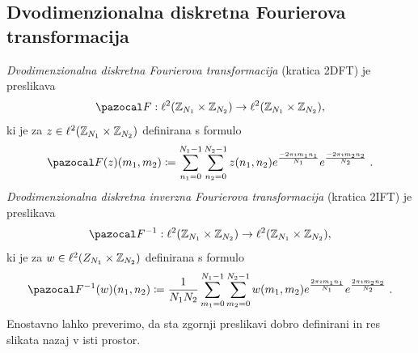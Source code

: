 \subsection{Dvodimenzionalna diskretna Fourierova transformacija}
\emph{Dvodimenzionalna diskretna Fourierova transformacija} (kratica 2DFT) je preslikava
$$\fun{\F}{\l^2(\Z_{N_1} \times \Z_{N_2})}{\l^2(\Z_{N_1} \times \Z_{N_2})},$$
ki je za $z \in \ell^2(\mathbb Z_{N_1} \times \mathbb Z_{N_2})$ definirana s formulo
$$\F(z)(m_1, m_2) \coloneqq \sum_{n_1 = 0}^{N_1 - 1} \sum_{n_2 = 0}^{N_2 - 1} z(n_1, n_2) e^{\frac{-2\pi \imath m_1n_1}{N_1}} e^{\frac{-2\pi \imath m_2n_2}{N_2}} \;.$$
\emph{Dvodimenzionalna diskretna inverzna Fourierova transformacija} (kratica 2IFT) je preslikava
$$\fun{\F^{-1}}{\l^2(\Z_{N_1} \times \Z_{N_2})}{\l^2(\Z_{N_1} \times \Z_{N_2})},$$
ki je za $w \in \ell^2(Z_{N_1} \times \mathbb Z_{N_2})$ definirana s formulo
$$\F^{-1}(w)(n_1, n_2) \coloneqq \frac{1}{N_1 N_2} \sum_{m_1 = 0}^{N_1 - 1} \sum_{m_2 = 0}^{N_2 - 1} w(m_1, m_2) e^{\frac{2\pi \imath m_1n_1}{N_1}} e^{\frac{2\pi \imath m_2n_2}{N_2}} \;.$$
%
Enostavno lahko preverimo, da sta zgornji preslikavi dobro definirani in res slikata nazaj v isti prostor.

